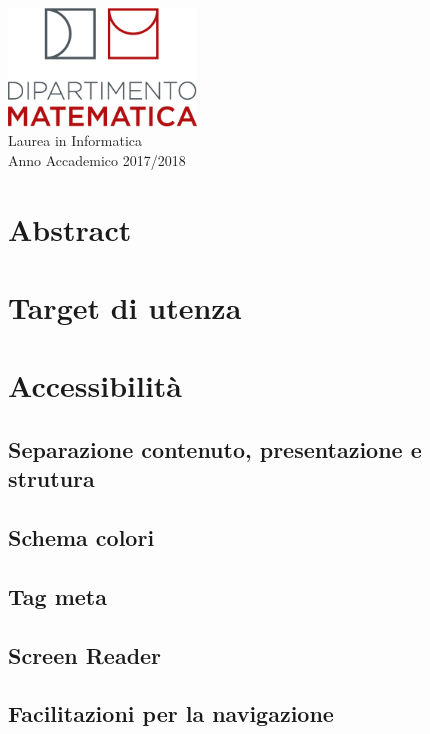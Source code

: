 \documentclass[10pt, a4paper]{article}
\newcommand{\normsize}{\fontsize{15pt}{10pt}\selectfont}
\begin{document}
\begin{titlepage}
\vspace*{8px}

\includegraphics[width=50mm]{Images/dip_mat.png}\\
\vspace*{\fill} %
\vspace*{3px}
{\normsize Laurea in Informatica\\ }
\vspace*{0.25px}
{\small Anno Accademico 2017/2018\\ }


\end{titlepage}
\tableofcontents

\section{Abstract}

\section{Target di utenza}

\section{Accessibilità}
	\subsection{Separazione contenuto, presentazione e strutura}
	\subsection{Schema colori}
	\subsection{Tag meta}
	\subsection{Screen Reader}
	\subsection{Facilitazioni per la navigazione}
\end{document}
